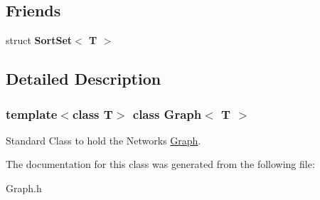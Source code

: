 \subsection*{Friends}
\begin{DoxyCompactItemize}
\item 
\hypertarget{class_graph_aae20d19edfbecdecc77d246d85b7f1a0}{}\label{class_graph_aae20d19edfbecdecc77d246d85b7f1a0} 
struct {\bfseries Sort\+Set$<$ T $>$}
\end{DoxyCompactItemize}


\subsection{Detailed Description}
\subsubsection*{template$<$class T$>$\newline
class Graph$<$ T $>$}

Standard Class to hold the Network\textquotesingle{}s \hyperlink{class_graph}{Graph}. 

The documentation for this class was generated from the following file\+:\begin{DoxyCompactItemize}
\item 
Graph.\+h\end{DoxyCompactItemize}
